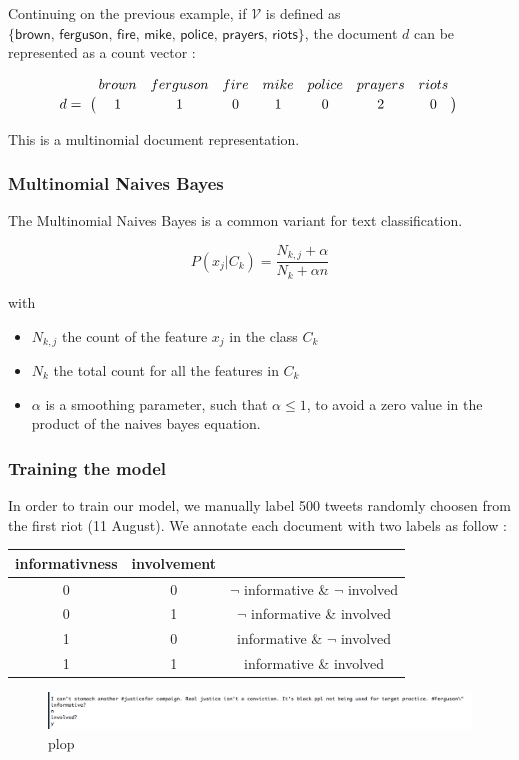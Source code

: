 \documentclass[a4paper,12pt]{report}
\begin{document}
Continuing on the previous example, if $\mathcal{V}$ is defined as $\{\textsf{brown, ferguson, fire, mike, police, prayers, riots}\}$, the document $d$ can be represented as a count vector :

$$
\bordermatrix{~ & brown & ferguson & fire & mike & police & prayers & riots \cr d =  & 1 & 1 & 0 & 1 & 0 & 2 & 0 \cr}
$$

This is a multinomial document representation.

\subsubsection{Multinomial Naives Bayes}
The Multinomial Naives Bayes is a common variant for text classification.

$$ 
\boxed{P(x_{j}| C_k ) = \frac{N_{k,j} + \alpha}{N_k + \alpha n}}
$$

with 
\begin{itemize}
\item $N_{k,j}$ the count of the feature $x_j$ in the class $C_k$
\item $N_{k}$ the total count for all the features in $C_k$
\item $\alpha$ is a smoothing parameter, such that $\alpha \leq 1$, to avoid a zero value in the product of the naives bayes equation.
\end{itemize}


\subsubsection{Training the model}
In order to train our model, we manually label 500 tweets randomly choosen from the first riot (11 August). We annotate each document with two labels as follow : 

\begin{center}
\begin{tabular}{ccc}
informativness & involvement & ~ \\ \hline
0 & 0 & $\neg$ informative \& $\neg$ involved \\ \hline
0 & 1 & $\neg$ informative \& involved \\ \hline
1 & 0 & informative \& $\neg$ involved \\ \hline
1 & 1 & informative \& involved \\ \hline
\end{tabular}
\end{center}

\begin{figure}[H]
\centering
\includegraphics[width=\textwidth]{images/screens/manual_label_screen.png}
\caption{plop}
\end{figure}
\end{document}
